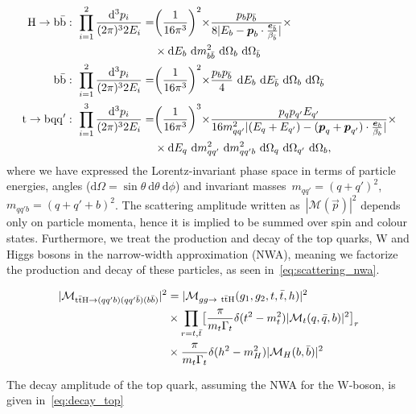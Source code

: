 \begin{align}
\label{eq:phase_space_jacobian}
\mathrm{H} \rightarrow \mathrm{b}\bar{\mathrm{b}}:\ \prod_{i=1}^{2} \frac{\mathrm{d}^3 p_i}{(2\pi)^3 2 E_i} =& \biggr(\frac{1}{16 \pi^3}\biggl)^2 \times \frac{p_b p_{\bar{b}}}{8 |E_b - \boldsymbol{p}_b \cdot \frac{\boldsymbol{e}_{\bar{b}}}{\beta_{\bar{b}}}|} \times \\
&\times\mathrm{d}E_{b}~\mathrm{d}m^2_{b\bar{b}}~\mathrm{d}\Omega_{b}~\mathrm{d}\Omega_{\bar{b}} \\
\mathrm{b}\bar{\mathrm{b}}:\ \prod_{i=1}^{2} \frac{\mathrm{d}^3 p_i}{(2\pi)^3 2 E_i} =& \biggr(\frac{1}{16 \pi^3}\biggl)^2 \times \frac{p_b p_{\bar{b}}}{4}~\mathrm{d}E_{b}~\mathrm{d}E_{\bar{b}}~\mathrm{d}\Omega_{b}~\mathrm{d}\Omega_{\bar{b}} \\
\mathrm{t} \rightarrow \mathrm{b}\mathrm{q}\mathrm{q}':\ \prod_{i=1}^{3} \frac{\mathrm{d}^3 p_i}{(2\pi)^3 2 E_i} =& \biggr(\frac{1}{16 \pi^3}\biggl)^3 \times \frac{p_q p_{q'} E_{q'}}{16 m_{qq'}^2 |(E_q + E_{q'}) - (\boldsymbol{p}_q + \boldsymbol{p}_{q'})\cdot \frac{\boldsymbol{e}_b}{\beta_b}|}\times\\
&\times\mathrm{d}E_{q}~\mathrm{d}m^2_{qq'}~\mathrm{d}m^2_{qq'b}~\mathrm{d}\Omega_{q}~\mathrm{d}\Omega_{q'}~\mathrm{d}\Omega_b,
\end{align}
where we have expressed the Lorentz-invariant phase space in terms of particle energies, angles ($\mathrm{d}\Omega = \sin{\theta}~\mathrm{d}\theta~\mathrm{d}\phi$) and invariant masses~$m_{qq'} = (q+q')^2$,~$m_{qq'b} = (q + q' + b)^2$.
The scattering amplitude written as~$|\mathcal{M}(\vec{p})|^2$ depends only on particle momenta, hence it is implied to be summed over spin and colour states. Furthermore, we treat the production and decay of the top quarks, W and Higgs bosons in the narrow-width approximation (NWA), meaning we factorize the production and decay of these particles, as seen in~\cref{eq:scattering_nwa}.

\begin{align}
\label{eq:scattering_nwa}
|\mathcal{M}_{\mathrm{t} \bar{\mathrm{t}} \mathrm{H} \rightarrow (qq'b) (qq'\bar{b}) (b\bar{b})}|^2 &= |\mathcal{M}_{gg \rightarrow~\mathrm{t} \bar{\mathrm{t}} \mathrm{H}}(g_1, g_2, t, \bar{t}, h)|^2 \\
&\times \prod_{r = t,\bar{t}} \bigl[ \frac{\pi}{m_t \Gamma_t} \delta(t^2 - m_t^2) |\mathcal{M}_t(q,\bar{q},b)|^2 \bigr]_r \\
&\times \frac{\pi}{m_t \Gamma_t} \delta(h^2 - m_H^2) |\mathcal{M}_H(b,\bar{b})|^2
\end{align}

The decay amplitude of the top quark, assuming the NWA for the W-boson, is given in~\cref{eq:decay_top}

